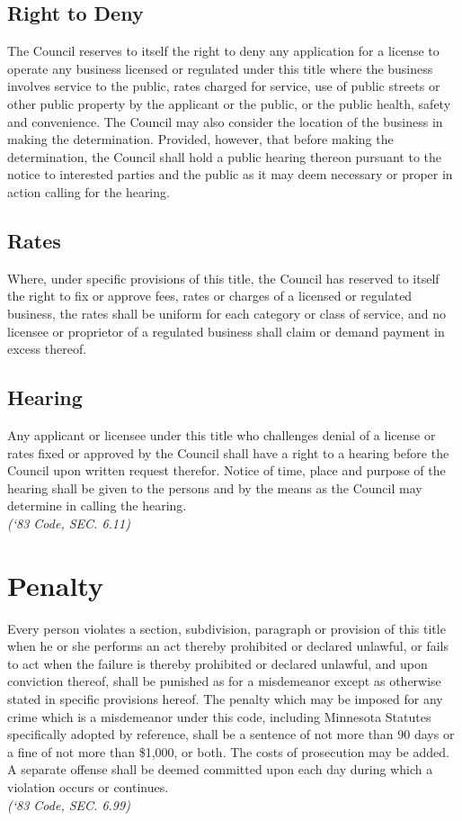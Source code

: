 \subsection{Right to Deny}
The Council reserves to itself the right to deny any application for a license to operate any business licensed or regulated under this title where the business involves service to the public, rates charged for service, use of public streets or other public property by the applicant or the public, or the public health, safety and convenience.  The Council may also consider the location of the business in making the determination.  Provided, however, that before making the determination, the Council shall hold a public hearing thereon pursuant to the notice to interested parties and the public as it may deem necessary or proper in action calling for the hearing.
\subsection{Rates}
Where, under specific provisions of this title, the Council has reserved to itself the right to fix or approve fees, rates or charges of a licensed or regulated business, the rates shall be uniform for each category or class of service, and no licensee or proprietor of a regulated business shall claim or demand payment in excess thereof.
\subsection{Hearing}
Any applicant or licensee under this title who challenges denial of a license or rates fixed or approved by the Council shall have a right to a hearing before the Council upon written request therefor.  Notice of time, place and purpose of the hearing shall be given to the persons and by the means as the Council may determine in calling the hearing.\\
\emph{(‘83 Code, SEC. 6.11)}

\setcounter{section}{98}
\section{Penalty}
Every person violates a section, subdivision, paragraph or provision of this title when he or she performs an act thereby prohibited or declared unlawful, or fails to act when the failure is thereby prohibited or declared unlawful, and upon conviction thereof, shall be punished as for a misdemeanor except as otherwise stated in specific provisions hereof.  The penalty which may be imposed for any crime which is a misdemeanor under this code, including Minnesota Statutes specifically adopted by reference, shall be a sentence of not more than 90 days or a fine of not more than \$1,000, or both.  The costs of prosecution may be added.  A separate offense shall be deemed committed upon each day during which a violation occurs or continues.\\
\emph{(‘83 Code, SEC. 6.99)}

